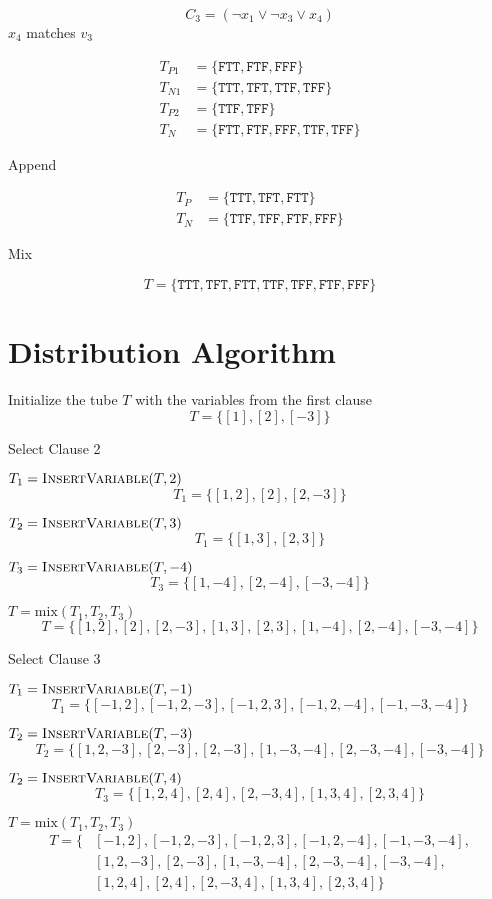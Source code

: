 \[
C_3 = (\neg x_1 \vee \neg x_3 \vee x_4)
\]
\noindent $x_4$ matches $v_3$

\begin{align*}
T_{P1} &= \{\texttt{FTT}, \texttt{FTF}, \texttt{FFF}\}\\
T_{N1} &= \{\texttt{TTT}, \texttt{TFT}, \texttt{TTF}, \texttt{TFF}\}\\
T_{P2} &= \{\texttt{TTF}, \texttt{TFF}\}\\
T_N &= \{\texttt{FTT}, \texttt{FTF}, \texttt{FFF}, \texttt{TTF}, \texttt{TFF}\}
\end{align*}

\noindent Append

\begin{align*}
T_P &= \{\texttt{TTT}, \texttt{TFT}, \texttt{FTT}\}\\
T_N &= \{\texttt{TTF}, \texttt{TFF}, \texttt{FTF}, \texttt{FFF}\}
\end{align*}

\noindent Mix

\[
T = \{\texttt{TTT}, \texttt{TFT}, \texttt{FTT}, \texttt{TTF}, \texttt{TFF}, \texttt{FTF}, \texttt{FFF}\}
\]


\section{Distribution Algorithm}

Initialize the tube $T$ with the variables from the first clause
\[
	T = \{[1], [2], [-3]\}
\]	

\noindent Select Clause 2


\par $T_1 =	\text{{\sc InsertVariable}}(T, 2)$
\[
		T_1 =  \{[1,2], [2], [2,-3]\}
\]
\par $T_2 =	\text{{\sc InsertVariable}}(T, 3)$
\[	
		T_1 =  \{[1,3], [2,3]\}	
\]
\par $T_3 =	\text{{\sc InsertVariable}}(T, -4)$
\[	
		T_3 =  \{[1,-4], [2,-4], [-3,-4]\}			
\]		
\par $T = \text{mix}(T_1, T_2, T_3)$
\[	
		T = \{[1,2], [2], [2,-3], [1,3], [2,3], [1,-4], [2,-4], [-3,-4]\}
\]		

\noindent Select Clause 3
	
\par $T_1 = 	\text{{\sc InsertVariable}}(T, -1)$
\[
		T_1 = \{[-1,2], [-1,2,-3], [-1,2,3], [-1,2,-4], [-1,-3,-4]\}
\]	
\par $T_2 =	\text{{\sc InsertVariable}}(T, -3)$
\[
		T_2 = \{[1,2,-3], [2,-3], [2,-3], [1,-3,-4], [2,-3,-4], [-3,-4]\}
\]
\par $T_2 =	\text{{\sc InsertVariable}}(T, 4)$
\[
		T_3 = \{[1,2,4], [2,4], [2,-3,4], [1,3,4], [2,3,4]\}
\]
\par $T = \text{mix}(T_1, T_2, T_3)$
\begin{align*}
		T = \{&[-1,2], [-1,2,-3], [-1,2,3], [-1,2,-4], [-1,-3,-4],\\
			  &[1,2,-3], [2,-3], [1,-3,-4], [2,-3,-4], [-3,-4],\\
			  &[1,2,4], [2,4], [2,-3,4], [1,3,4], [2,3,4]\}
\end{align*}

